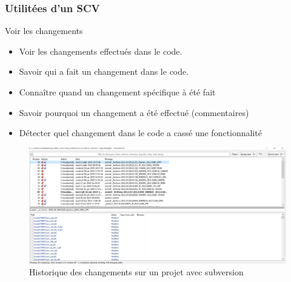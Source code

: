 \documentclass{beamer}
\begin{document}
\begin{frame}
\frametitle{Utilitées d'un SCV}

\begin{block}{Voir les changements}
\begin{itemize}
\item Voir les changements effectués dans le code.
\item Savoir qui a fait un changement dans le code.
\item Connaître quand un changement spécifique à été fait
\item Savoir pourquoi un changement a été effectué (commentaires)
\item  Détecter quel changement dans le code a cassé une fonctionnalité
\end{itemize}
\end{block}
\end{frame}
\begin{figure}
 \includegraphics[width=\textwidth]{../images/history.jpg}
 \caption{Historique des changements sur un projet avec subversion}
 \end{figure}
\end{document}
